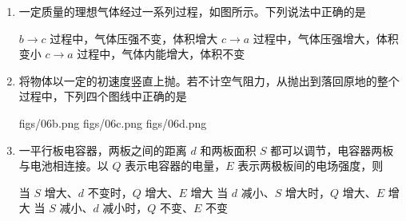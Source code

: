 \documentclass[\gkver]{gaokaozhenti}
\begin{document}
\begin{enumerate}
\onepicture[align=right, w=2.93cm]{}

{电子将向左偏转，速率改变}
{电子将向左偏转，速率不变}
{电子将向右偏转，速率改变}


\item
一定质量的理想气体经过一系列过程，如图所示。下列说法中正确的是


{$b\to c$ 过程中，气体压强不变，体积增大}
{$c\to a$ 过程中，气体压强增大，体积变小}
{$c\to a$ 过程中，气体内能增大，体积不变}


\item
将物体以一定的初速度竖直上抛。若不计空气阻力，从抛出到落回原地的整个过程中，下列四个图线中正确的是

{figs/06b.png}
{figs/06c.png}
{figs/06d.png}


\item
一平行板电容器，两板之间的距离 $d$ 和两板面积 $S$ 都可以调节，电容器两板与电池相连接。以 $Q$ 表示电容器的电量，$E$ 表示两极板间的电场强度，则

{当 $S$ 增大、$d$ 不变时，$Q$ 增大、$E$ 增大}
{当 $d$ 减小、$S$ 增大时，$Q$ 增大、$E$ 增大}
{当 $S$ 减小、$d$ 减小时，$Q$ 不变、$E$ 不变}



\end{enumerate}
\end{document}
